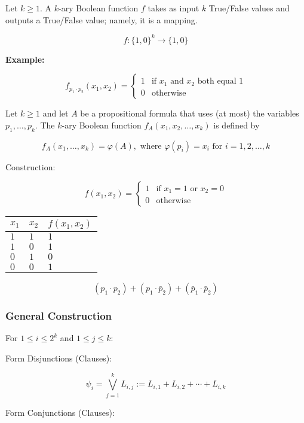 \documentclass[12pt,a4paper,openany]{article}
\begin{document}
Let $k \geq 1$. A $k$-ary Boolean function $f$ takes as input
$k$ True/False values and outputs a True/False value; namely, it is a
mapping.

$$f : \{1, 0\}^k \to \{1, 0\}$$

\textbf{Example:}

$$f_{p_1 \cdot p_2}(x_1, x_2) = \begin{cases} 1 & \text{if } x_1 \text{ and } x_2 \text{ both equal } 1 \\ 0 & \text{otherwise} \end{cases}$$

Let $k \geq 1$ and let $A$ be a propositional formula that uses (at
most) the variables $p_1, \ldots, p_k$. The $k$-ary Boolean function
$f_A(x_1, x_2, \ldots, x_k)$ is defined by

$$f_A(x_1, \ldots, x_k) = \varphi(A), \text{ where } \varphi(p_i) = x_i \text{ for } i = 1, 2, \ldots, k$$

Construction:

$$f(x_1, x_2) = \begin{cases} 1 & \text{if } x_1 = 1 \text{ or } x_2 = 0 \\ 0 & \text{otherwise} \end{cases}$$

\begin{center}
\begin{tabular}{|l|l|l|}
\hline
$x_1$ & $x_2$ & $f(x_1, x_2)$ \\
\hline
$1$ & $1$ & $1$ \\
\hline
$1$ & $0$ & $1$ \\
\hline
$0$ & $1$ & $0$ \\
\hline
$0$ & $0$ & $1$ \\
\hline
\end{tabular}
\end{center}

$$(p_1 \cdot p_2) + (p_1 \cdot \bar p_2) + (\bar p_1 \cdot \bar p_2)$$

\subsubsection{General Construction}

For $1 \leq i \leq 2^k$ and $1 \leq j \leq k$:

Form Disjunctions (Clauses):

$$\psi_i = \displaystyle\bigvee_{j=1}^k L_{i,j} := L_{i,1} + L_{i,2} + \cdots + L_{i,k}$$

Form Conjunctions (Clauses):
\end{document}
